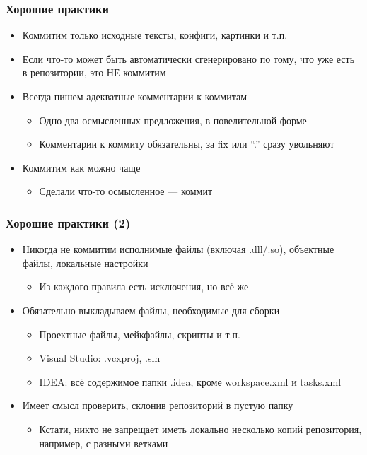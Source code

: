\documentclass{../../slides-style}
\begin{document}
    \begin{frame}
        \frametitle{Хорошие практики}
        \begin{itemize}
            \item Коммитим только исходные тексты, конфиги, картинки и т.п.
            \item Если что-то может быть автоматически сгенерировано по тому, что уже есть в репозитории, это НЕ коммитим
            \item Всегда пишем адекватные комментарии к коммитам
            \begin{itemize}
                \item Одно-два осмысленных предложения, в повелительной форме
                \item Комментарии к коммиту обязательны, за fix или ``.'' сразу увольняют
            \end{itemize}
            \item Коммитим как можно чаще
            \begin{itemize}
                \item Сделали что-то осмысленное --- коммит
            \end{itemize}
        \end{itemize}
    \end{frame}

    \begin{frame}
        \frametitle{Хорошие практики (2)}
        \begin{itemize}
            \item Никогда не коммитим исполнимые файлы (включая .dll/.so), объектные файлы, локальные настройки
            \begin{itemize}
                \item Из каждого правила есть исключения, но всё же
            \end{itemize}
            \item Обязательно выкладываем файлы, необходимые для сборки
            \begin{itemize}
                \item Проектные файлы, мейкфайлы, скрипты и т.п.
                \item Visual Studio: .vcxproj, .sln
                \item IDEA: всё содержимое папки .idea, кроме workspace.xml и tasks.xml
            \end{itemize}
            \item Имеет смысл проверить, склонив репозиторий в пустую папку
            \begin{itemize}
                \item Кстати, никто не запрещает иметь локально несколько копий репозитория, например, с разными ветками
            \end{itemize}
        \end{itemize}
    \end{frame}
\end{document}
